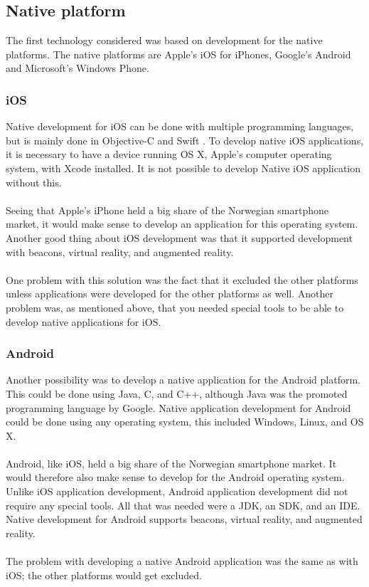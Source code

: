 \subsection{Native platform}
The first technology considered was based on development for the native platforms. The native platforms are Apple's iOS for iPhones, Google's Android and Microsoft's Windows Phone.

\subsubsection{iOS}
Native development for iOS can be done with multiple programming languages, but is mainly done in Objective-C and Swift\cite{ios2} \cite{ios3}. To develop native iOS applications, it is necessary to have a device running OS X, Apple's computer operating system, with Xcode installed. It is not possible to develop Native iOS application without this\cite{ios1}.\\
\\
Seeing that Apple's iPhone held a big share of the Norwegian smartphone market, it would make sense to develop an application for this operating system. Another good thing about iOS development was that it supported development with beacons, virtual reality, and augmented reality.\\
\\
One problem with this solution was the fact that it excluded the other platforms unless applications were developed for the other platforms as well. Another problem was, as mentioned above, that you needed special tools to be able to develop native applications for iOS.


\subsubsection{Android}
Another possibility was to develop a native application for the Android platform. This could be done using Java, C, and C++, although Java was the promoted programming language by Google\cite{android1}. Native application development for Android could be done using any operating system, this included Windows, Linux, and OS X.\\
\\
Android, like iOS, held a big share of the Norwegian smartphone market. It would therefore also make sense to develop for the Android operating system. Unlike iOS application development, Android application development did not require any special tools. All that was needed were a JDK, an SDK, and an IDE. Native development for Android supports beacons, virtual reality, and augmented reality. \\
\\
The problem with developing a native Android application was the same as with iOS; the other platforms would get excluded.

